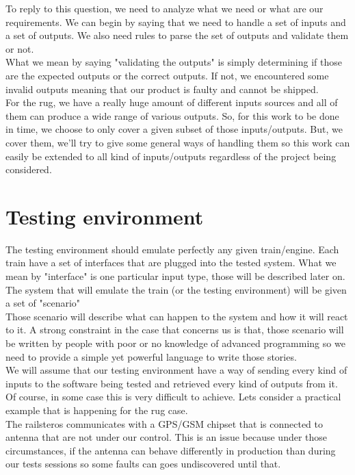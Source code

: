 \documentclass[12pt]{article}
\theoremstyle{definition}
\theoremstyle{definition}
\begin{document}
To reply to this question, we need to analyze what we need or what are our requirements. We can begin by saying that we need to handle a set of inputs and a set of outputs. We also need rules to parse the set of outputs and validate them or not.\\

What we mean by saying "validating the outputs" is simply determining if those are the expected outputs or the correct outputs. If not, we encountered some invalid outputs meaning that our product is faulty and cannot be shipped.\\

For the \gls{rug}, we have a really huge amount of different inputs sources and all of them can produce a wide range of various outputs. So, for this work to be done in time, we choose to only cover a given subset of those inputs/outputs. But, we cover them, we'll try to give some general ways of handling them so this work can easily be extended to all kind of inputs/outputs regardless of the project being considered.


\section{Testing environment}

The testing environment should emulate perfectly any given train/engine. Each train have a set of interfaces that are plugged into the tested system. What we mean by "interface" is one particular input type, those will be described later on. The system that will emulate the train (or the testing environment) will be given a set of "scenario"\\

Those scenario will describe what can happen to the system and how it will react to it. A strong constraint in the case that concerns us is that, those scenario will be written by people with poor or no knowledge of advanced programming so we need to provide a simple yet powerful language to write those stories.\\

We will assume that our testing environment have a way of sending every kind of inputs to the software being tested and retrieved every kind of outputs from it. Of course, in some case this is very difficult to achieve. Lets consider a practical example that is happening for the \gls{rug} case.\\

The \gls{railsteros} communicates with a GPS/GSM chipset that is connected to antenna that are not under our control. This is an issue because under those circumstances, if the antenna can behave differently in production than during our tests sessions so some faults can goes undiscovered until that.\\
\end{document}
